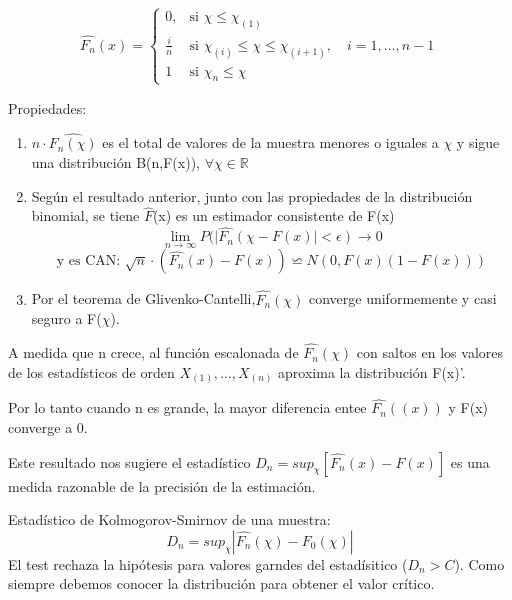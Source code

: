 \[
\hat{F_n}(x)=
\left\{
\begin{array}{ll}
    0, & \text{si } \chi \leq \chi_{(1)}\\
    \frac{i}{n} & \text{si } \chi_{(i)} \leq \chi \leq \chi_{(i+1)}, \quad i=1,\dots,n-1 \\
    1 & \text{si } \chi_{n} \leq \chi
\end{array}
\right.
\]


Propiedades:
\begin{enumerate}
    \item $n\cdot \hat{F_n(\chi)}$ es el total de valores de la muestra menores o iguales a $\chi$ y sigue una distribución B(n,F(x)), $\forall \chi \in \mathbb{R}$
    \item Según el resultado anterior, junto con las propiedades de la distribución binomial, se tiene $\hat{F}$(x) es un estimador consistente de F(x)
    \[
    \lim_{n \to \infty} P(| \hat{F_n}(\chi - F(x)| < \epsilon) \to 0
    \]
    \[
    \text{y es CAN: }\sqrt{n}\cdot(\hat{F_n}(x)-F(x))\backsimeq N(0,F(x)(1-F(x)))
    \]
    \item Por el teorema de Glivenko-Cantelli,$\hat{F_n}(\chi)$ converge uniformemente y casi seguro a F($\chi$).
\end{enumerate}

A medida que n crece, al función escalonada de $\hat{F_n}(\chi)$ con saltos en los valores de los estadísticos de orden $X_{(1)},\dots,X_{(n)}$ aproxima la distribución F(x)'.

Por lo tanto cuando n es grande, la mayor diferencia entee $\hat{F_n}((x))$ y F(x) converge a 0.

Este resultado nos sugiere el estadístico $
D_n=sup_\chi[\hat{F_n}(x)-F(x)]
$ es una medida razonable de la precisión de la estimación.

Estadístico de Kolmogorov-Smirnov de una muestra:
\[
    D_n=sup_\chi|\hat{F_n}(\chi)-F_0(\chi)|
\]
El test rechaza la hipótesis para valores garndes del estadísitico ($D_n>C$).
Como siempre debemos conocer la distribución para obtener el valor crítico.
